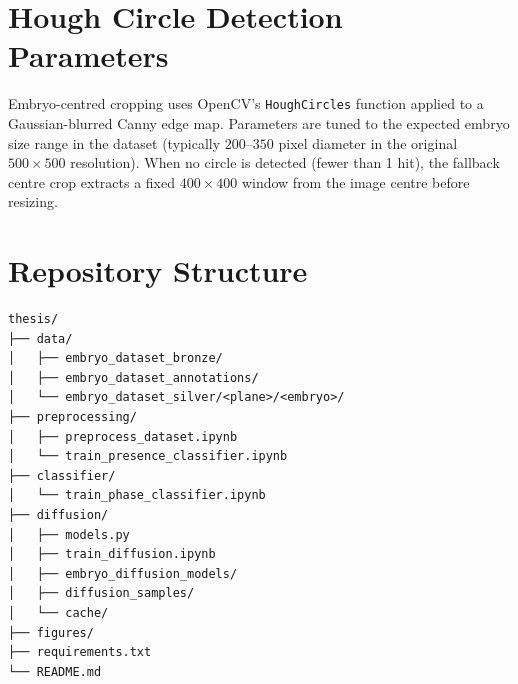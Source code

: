 \documentclass[12pt, a4paper, twoside]{report}
\begin{document}
\chapter{Hough Circle Detection Parameters}
\label{app:hough}

Embryo-centred cropping uses OpenCV's \texttt{HoughCircles} function
applied to a Gaussian-blurred Canny edge map.
Parameters are tuned to the expected embryo size range in the dataset
(typically $200$--$350$ pixel diameter in the original $500 \times 500$
resolution).
When no circle is detected (fewer than 1 hit), the fallback centre crop
extracts a fixed $400 \times 400$ window from the image centre before
resizing.

\chapter{Repository Structure}
\label{app:repo}

\begin{verbatim}
thesis/
├── data/
│   ├── embryo_dataset_bronze/
│   ├── embryo_dataset_annotations/
│   └── embryo_dataset_silver/<plane>/<embryo>/
├── preprocessing/
│   ├── preprocess_dataset.ipynb
│   └── train_presence_classifier.ipynb
├── classifier/
│   └── train_phase_classifier.ipynb
├── diffusion/
│   ├── models.py
│   ├── train_diffusion.ipynb
│   ├── embryo_diffusion_models/
│   ├── diffusion_samples/
│   └── cache/
├── figures/
├── requirements.txt
└── README.md
\end{verbatim}
\end{document}
